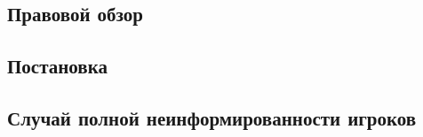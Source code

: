 

\subsection{Правовой обзор}


\subsection{Постановка}



\subsection{Случай полной неинформированности игроков}



